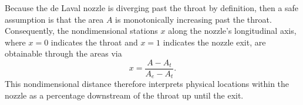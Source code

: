 \documentclass[11pt,dvipsnames]{thesis}
\begin{document}
Because the de Laval nozzle is diverging past the throat by definition, then a safe assumption is that the area $A$ is monotonically increasing past the throat. Consequently, the nondimensional stations $x$ along the nozzle's longitudinal axis, where $x = 0$ indicates the throat and $x = 1$ indicates the nozzle exit, are obtainable through the areas via
\begin{equation}
x = \frac{A - A_t}{A_e - A_t}. \label{eq:nondimPosNozzle}
\end{equation}
This nondimensional distance therefore interprets physical locations within the nozzle as a percentage downstream of the throat up until the exit.
\begin{figure}[H]
\centering
{}
\end{figure}
\end{document}

